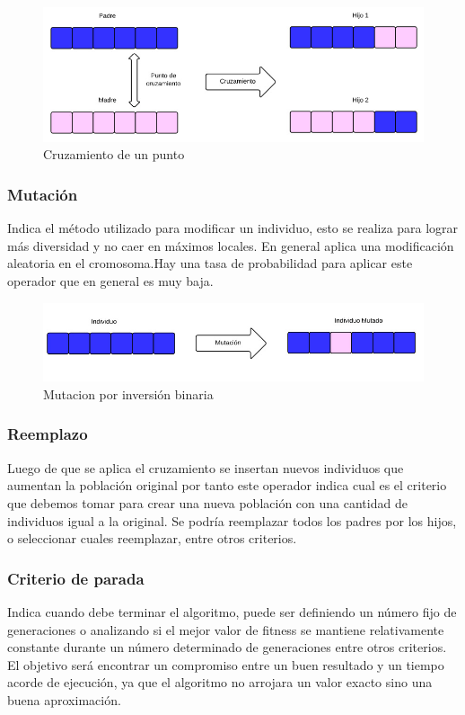 \begin{figure}[h]
	\centering
	\includegraphics[width=\textwidth]{Figures/cruzamiento1}
	\caption{Cruzamiento de un punto}
	\label{fig:cruzamiento1}
\end{figure}

\subsubsection{Mutación} 
Indica el método utilizado para modificar un individuo, esto se realiza para lograr más diversidad y no caer en máximos locales. En general aplica una modificación aleatoria en el cromosoma.Hay una tasa de probabilidad para aplicar este operador que en general es muy baja. 
\begin{figure}[h]
	\centering
	\includegraphics[width=1\linewidth]{Figures/mutacion1}
	\caption{Mutacion por inversión binaria}
	\label{fig:mutacion1}
\end{figure}


\subsubsection{Reemplazo} 
Luego de que se aplica el cruzamiento se insertan nuevos individuos que aumentan la población original por tanto este operador indica cual es el criterio que debemos tomar para crear una nueva población con una cantidad de individuos igual a la original.
Se podría reemplazar todos los padres por los hijos, o seleccionar cuales reemplazar, entre otros criterios.

\subsubsection{Criterio de parada} 
Indica cuando debe terminar el algoritmo, puede ser definiendo un número fijo de generaciones o analizando si el mejor valor de fitness se mantiene relativamente constante durante un número determinado de generaciones entre otros criterios. El objetivo será encontrar un compromiso entre un buen resultado y un tiempo acorde de ejecución, ya que el algoritmo no arrojara un valor exacto sino una buena aproximación. 

